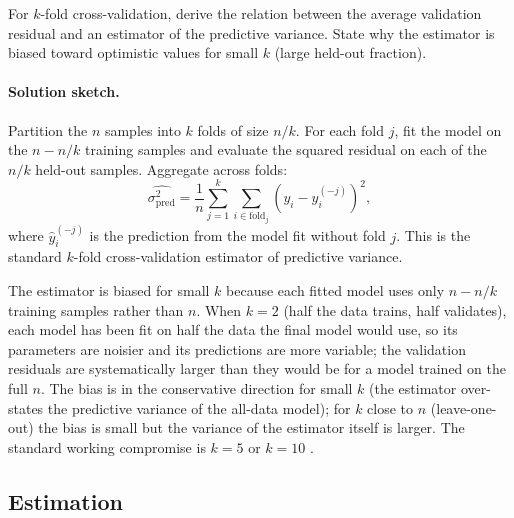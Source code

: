 \begin{exercise}
For $k$-fold cross-validation, derive the relation between the
average validation residual and an estimator of the predictive
variance. State why the estimator is biased toward
optimistic values for small $k$ (large held-out fraction).

\paragraph{Solution sketch.} Partition the $n$ samples into $k$
folds of size $n/k$. For each fold $j$, fit the model on the
$n - n/k$ training samples and evaluate the squared residual on
each of the $n/k$ held-out samples. Aggregate across folds:
\[
\widehat{\sigma_{\text{pred}}^{2}} = \frac{1}{n} \sum_{j=1}^{k}
\sum_{i \in \text{fold}_{j}} (y_{i} - \hat y_{i}^{(-j)})^{2},
\]
where $\hat y_{i}^{(-j)}$ is the prediction from the model fit
without fold $j$. This is the standard $k$-fold cross-validation
estimator of predictive variance.

The estimator is biased for small $k$ because each fitted model
uses only $n - n/k$ training samples rather than $n$. When $k = 2$
(half the data trains, half validates), each model has been fit
on half the data the final model would use, so its parameters are
noisier and its predictions are more variable; the validation
residuals are systematically larger than they would be for a model
trained on the full $n$. The bias is in the conservative direction
for small $k$ (the estimator over-states the predictive variance
of the all-data model); for $k$ close to $n$ (leave-one-out) the
bias is small but the variance of the estimator itself is larger.
The standard working compromise is $k = 5$ or $k = 10$
\cite{text:v2ch18-hastie-statistical-learning-2009}.
\end{exercise}


\subsection*{Estimation}

